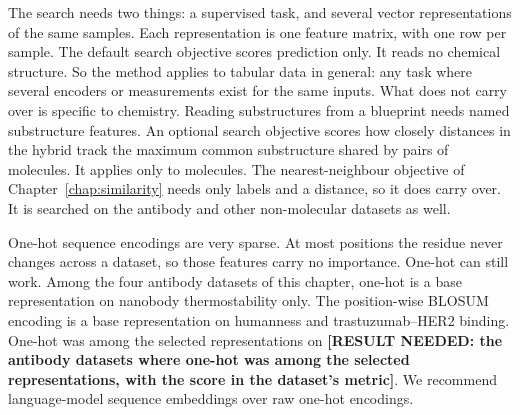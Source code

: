 
The search needs two things: a supervised task, and several vector representations of the same samples. Each representation is one feature matrix, with one row per sample. The default search objective scores prediction only. It reads no chemical structure. So the method applies to tabular data in general: any task where several encoders or measurements exist for the same inputs. What does not carry over is specific to chemistry. Reading substructures from a blueprint needs named substructure features. An optional search objective scores how closely distances in the hybrid track the maximum common substructure shared by pairs of molecules. It applies only to molecules. The nearest-neighbour objective of Chapter~\ref{chap:similarity} needs only labels and a distance, so it does carry over. It is searched on the antibody and other non-molecular datasets as well.

One-hot sequence encodings are very sparse. At most positions the residue never changes across a dataset, so those features carry no importance. One-hot can still work. Among the four antibody datasets of this chapter, one-hot is a base representation on nanobody thermostability only. The position-wise BLOSUM encoding is a base representation on humanness and trastuzumab--HER2 binding. One-hot was among the selected representations on \textbf{[RESULT NEEDED: the antibody datasets where one-hot was among the selected representations, with the score in the dataset's metric]}. We recommend language-model sequence embeddings over raw one-hot encodings.

